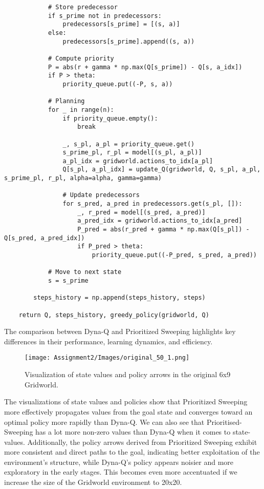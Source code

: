 \documentclass[12pt]{article}
\begin{document}
\begin{lstlisting}
            # Store predecessor
            if s_prime not in predecessors:
                predecessors[s_prime] = [(s, a)]
            else:
                predecessors[s_prime].append((s, a))

            # Compute priority
            P = abs(r + gamma * np.max(Q[s_prime]) - Q[s, a_idx])
            if P > theta:
                priority_queue.put((-P, s, a))

            # Planning
            for _ in range(n):
                if priority_queue.empty():
                    break
                
                _, s_pl, a_pl = priority_queue.get()
                s_prime_pl, r_pl = model[(s_pl, a_pl)]
                a_pl_idx = gridworld.actions_to_idx[a_pl]
                Q[s_pl, a_pl_idx] = update_Q(gridworld, Q, s_pl, a_pl, s_prime_pl, r_pl, alpha=alpha, gamma=gamma)

                # Update predecessors
                for s_pred, a_pred in predecessors.get(s_pl, []):
                    _, r_pred = model[(s_pred, a_pred)]
                    a_pred_idx = gridworld.actions_to_idx[a_pred]
                    P_pred = abs(r_pred + gamma * np.max(Q[s_pl]) - Q[s_pred, a_pred_idx])
                    if P_pred > theta:
                        priority_queue.put((-P_pred, s_pred, a_pred))

            # Move to next state
            s = s_prime

        steps_history = np.append(steps_history, steps)

    return Q, steps_history, greedy_policy(gridworld, Q)
\end{lstlisting}

\pagebreak

\noindent The comparison between Dyna-Q and Prioritized Sweeping highlights key differences in their performance, learning dynamics, and efficiency. \\

\begin{figure}[h!]
    \centering
    \texttt{[image: Assignment2/Images/original\_50\_1.png]}
    \caption{Visualization of state values and policy arrows in the original 6x9 Gridworld.}
    \label{fig:original_values_policy}
\end{figure}

\noindent The visualizations of state values and policies show that Prioritized Sweeping more effectively propagates values from the goal state and converges toward an optimal policy more rapidly than Dyna-Q. We can also see that Prioritised-Sweeping has a lot more non-zero values than Dyna-Q when it comes to state-values. Additionally, the policy arrows derived from Prioritized Sweeping exhibit more consistent and direct paths to the goal, indicating better exploitation of the environment’s structure, while Dyna-Q's policy appears noisier and more exploratory in the early stages.
This becomes even more accentuated if we increase the size of the Gridworld environment to 20x20. \\
\end{document}

